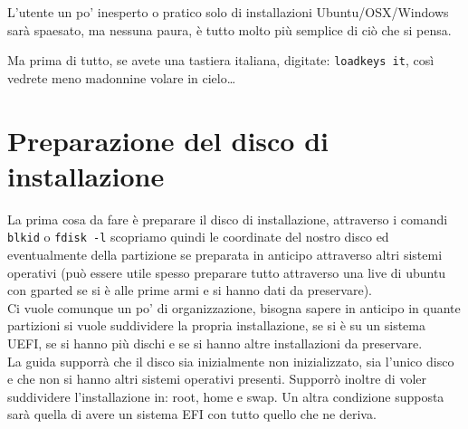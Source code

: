 \documentclass[twoside,italian]{book}
\newcommand{\code}[1]{\texttt{#1}}
\begin{document}
L'utente un po' inesperto o pratico solo di installazioni Ubuntu/OSX/Windows sarà spaesato, ma nessuna paura, è tutto molto più semplice di ciò che si pensa.

Ma prima di tutto, se avete una tastiera italiana, digitate: \code{loadkeys it}, così vedrete meno madonnine volare in cielo\dots

\section{Preparazione del disco di installazione}

    La prima cosa da fare è preparare il disco di installazione, attraverso i comandi \code{blkid} o \code{fdisk -l} scopriamo quindi le coordinate del nostro disco ed eventualmente della partizione se preparata in anticipo attraverso altri sistemi operativi (può essere utile spesso preparare tutto attraverso una live di ubuntu con gparted se si è alle prime armi e si hanno dati da preservare).\\

    Ci vuole comunque un po' di organizzazione, bisogna sapere in anticipo in quante partizioni si vuole suddividere la propria installazione, se si è su un sistema UEFI, se si hanno più dischi e se si hanno altre installazioni da preservare.\\

    La guida supporrà che il disco sia inizialmente non inizializzato, sia l'unico disco e che non si hanno altri sistemi operativi presenti. Supporrò inoltre di voler suddividere l'installazione in: root, home e swap. Un altra condizione supposta sarà quella di avere un sistema EFI con tutto quello che ne deriva.
\end{document}
